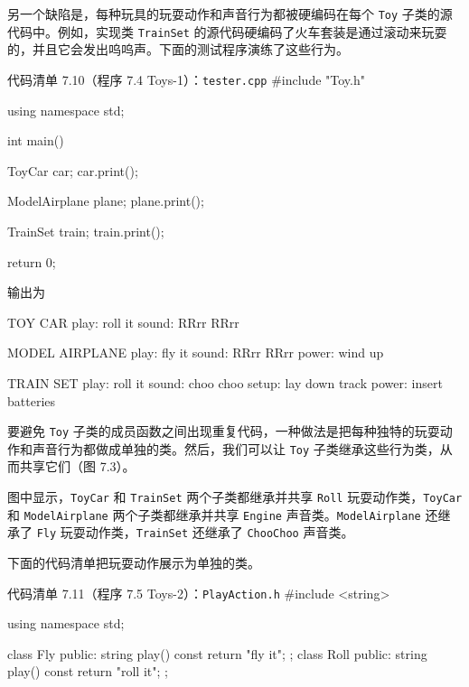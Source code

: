 另一个缺陷是，每种玩具的玩耍动作和声音行为都被硬编码在每个 \texttt{Toy} 子类的源代码中。例如，实现类 \texttt{TrainSet} 的源代码硬编码了火车套装是通过滚动来玩耍的，并且它会发出呜呜声。下面的测试程序演练了这些行为。

\begin{codeboxt}{代码清单 7.10（程序 7.4 Toys-1）：\texttt{tester.\allowbreak{}cpp}}
#include "Toy.h"

using namespace std;

int main()
{
    ToyCar car;
    car.print();

    ModelAirplane plane;
    plane.print();

    TrainSet train;
    train.print();

    return 0;
}
\end{codeboxt}

输出为

\begin{codebox}
TOY CAR
   play: roll it
  sound: RRrr RRrr

MODEL AIRPLANE
   play: fly it
  sound: RRrr RRrr
  power: wind up

TRAIN SET
   play: roll it
  sound: choo choo
  setup: lay down track
  power: insert batteries
\end{codebox}

要避免 \texttt{Toy} 子类的成员函数之间出现重复代码，一种做法是把每种独特的玩耍动作和声音行为都做成单独的类。然后，我们可以让 \texttt{Toy} 子类继承这些行为类，从而共享它们（图 7.3）。


图中显示，\texttt{ToyCar} 和 \texttt{TrainSet} 两个子类都继承并共享 \texttt{Roll} 玩耍动作类，\texttt{ToyCar} 和 \texttt{Model\allowbreak{}Airplane} 两个子类都继承并共享 \texttt{Engine} 声音类。\texttt{Model\allowbreak{}Airplane} 还继承了 \texttt{Fly} 玩耍动作类，\texttt{TrainSet} 还继承了 \texttt{ChooChoo} 声音类。


下面的代码清单把玩耍动作展示为单独的类。

\begin{codeboxt}{代码清单 7.11（程序 7.5 Toys-2）：\texttt{Play\allowbreak{}Action.\allowbreak{}h}}
#include <string>

using namespace std;

class Fly
{
public:
    string play() const { return "fly it"; }
};
class Roll
{
public:
    string play() const { return "roll it"; }
};
\end{codeboxt}

